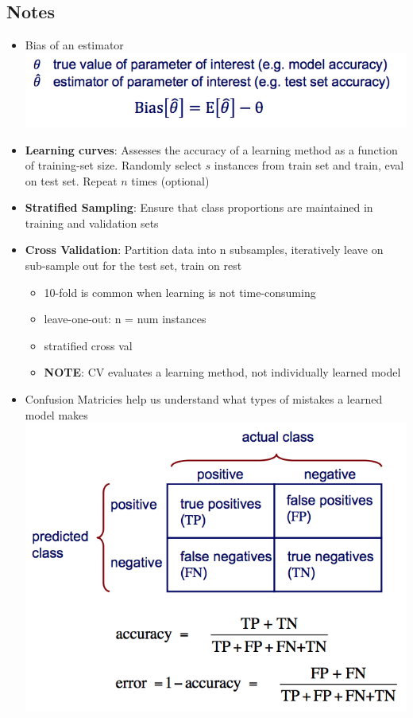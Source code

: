 \documentclass[a4paper]{article}
\begin{document}
\subsection{Notes}
\begin{itemize}

\item Bias of an estimator \\
  \includegraphics{bias}

\item \textbf{Learning curves}: Assesses the accuracy of a learning
  method as a function of training-set size. Randomly select $s$
  instances from train set and train, eval on test set. Repeat $n$
  times (optional)

\item \textbf{Stratified Sampling}: Ensure that class proportions are
  maintained in training and validation sets

\item \textbf{Cross Validation}: Partition data into n subsamples,
  iteratively leave on sub-sample out for the test set, train on rest
  \begin{itemize}
  \item 10-fold is common when learning is not time-consuming
  \item leave-one-out: n = num instances
  \item stratified cross val
  \item \textbf{NOTE}: CV evaluates a learning method, not
    individually learned model
  \end{itemize}

\item Confusion Matricies help us understand what types of mistakes a
  learned model makes \\
  \includegraphics{cm1}


\end{itemize}
\end{document}
